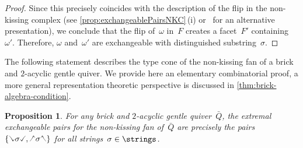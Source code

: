 \documentclass{amsart}
\newtheorem{proposition}[theorem]{Proposition}
\theoremstyle{definition}
\newcommand{\quiver}{\bar Q} %
\newcommand{\hL}{\text{\rotatebox[origin=c]{180}{\checked}}}
\newcommand{\hR}{\text{\rotatebox[origin=c]{180}{\reflectbox{\checked}}}}
\newcommand{\cL}{\text{\reflectbox{\checked}}}
\newcommand{\cR}{\text{\checked}}
\newcommand{\hh}[1]{\hL#1\hR} %
\newcommand{\cc}[1]{\cL#1\cR} %
\begin{document}
\begin{proof}
Since this precisely coincides with the description of the flip in the non-kissing complex (see \cref{prop:exchangeablePairsNKC}\,(i) or~\cite[Prop.~2.33]{PaluPilaudPlamondon-nonkissing} for an alternative presentation), we conclude that the flip of~$\omega$ in~$F$ creates a facet~$F'$ containing~$\omega'$.
Therefore, $\omega$ and~$\omega'$ are exchangeable with distinguished substring~$\sigma$.
\end{proof}

The following statement describes the type cone of the non-kissing fan of a brick and $2$-acyclic gentle quiver.
We provide here an elementary combinatorial proof, a more general representation theoretic perspective is discussed in \cref{thm:brick-algebra-condition}.

\begin{proposition}
\label{prop:extremalExchangeablePairsNKC}
For any brick and $2$-acyclic gentle quiver~$\quiver$, the extremal exchangeable pairs for the non-kissing fan of~$\quiver$ are precisely the pairs~$\{\cc{\sigma}, \hh{\sigma}\}$ for all strings~$\sigma \in \strings$.
\end{proposition}
\end{document}
